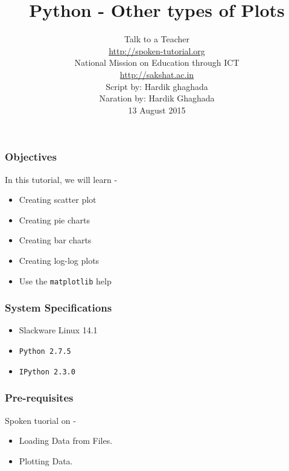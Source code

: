 \documentclass[17pt,compress]{beamer}
\author[FOSSEE]{}
\institute[IIT Bombay]{}
\date[]{}
\begin{document}
\sffamily \bfseries
\title
[Other types of Plots]
{Python - Other types of Plots}
\author
[FOSSEE, IIT - Bombay]
{\small Talk to a Teacher\\{\color{blue}\url{http://spoken-tutorial.org}}\\National Mission on Education
 through ICT\\{\color{blue}\url{http://sakshat.ac.in}} \\[0.5cm]{\tiny Script by: Hardik ghaghada \\ Naration by: Hardik Ghaghada \\ 13 August 2015}}

\begin{frame}
   \titlepage
\end{frame}
\begin{frame}
\frametitle{Objectives}
\label{sec-2}

  In this tutorial, we will learn -\pause

\begin{itemize}
\item Creating scatter plot\pause
\item Creating pie charts\pause
\item Creating bar charts\pause
\item Creating log-log plots\pause
\item Use the \texttt{matplotlib} help
\end{itemize}
\end{frame}
\begin{frame}
\frametitle{System Specifications}\pause
\begin{itemize}
\item Slackware Linux 14.1\pause
\item \texttt{Python 2.7.5} \pause
\item \texttt{IPython 2.3.0}
\end{itemize}
\end{frame}
\begin{frame}
\frametitle{Pre-requisites}
\label{sec-3}
Spoken tuorial on -
\begin{itemize}
\item Loading Data from Files.\pause
\item Plotting Data.
\end{itemize}
\end{frame}
\end{document}

